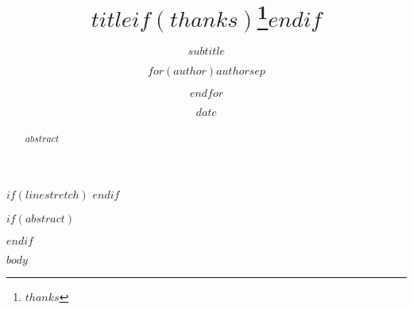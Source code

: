 \documentclass[
  $if(fontsize)$
  $fontsize$,
  $endif$
  $if(papersize)$
  $papersize$paper,
  $endif$]{$documentclass$}
\title{$title$$if(thanks)$\thanks{$thanks$}$endif$}
\subtitle{$subtitle$}
\author{$for(author)$$author$$sep$ \and $endfor$}
\date{$date$}
\begin{document}
\emergencystretch=10pt

$if(linestretch)$
$endif$

\clearpage\maketitle
\thispagestyle{empty}

$if(abstract)$
\begin{abstract}
$abstract$
\end{abstract}
$endif$

\vspace*{-20mm}
\tableofcontents

\clearpage
{}

$body$
\end{document}
